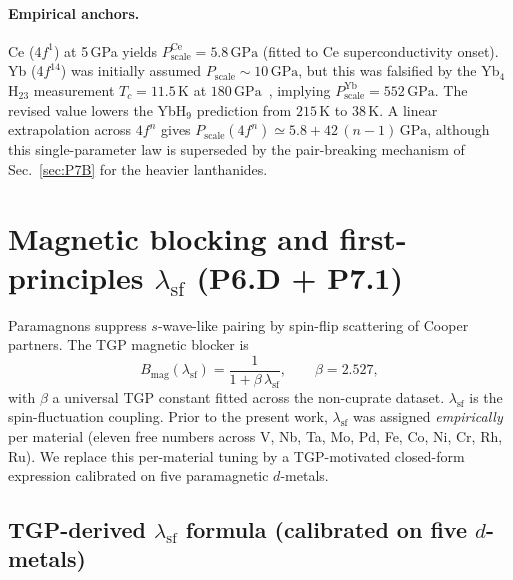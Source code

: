 \documentclass[11pt,a4paper]{article}
\newcommand{\lamsf}{\lambda_{\mathrm{sf}}}
\newcommand{\GPa}{\,\mathrm{GPa}}
\newcommand{\Bmag}{B_{\mathrm{mag}}}
\begin{document}
\paragraph{Empirical anchors.}
Ce (4$f^{1}$) at 5\,GPa yields $P_{\mathrm{scale}}^{\mathrm{Ce}}
=5.8\GPa$ (fitted to Ce superconductivity onset).
Yb (4$f^{14}$) was initially assumed $P_{\mathrm{scale}}\sim 10\GPa$, but
this was falsified by the Yb$_{4}$H$_{23}$ measurement $T_{c}=11.5$\,K at
$180\GPa$~\cite{Sharps2025}, implying $P_{\mathrm{scale}}^{\mathrm{Yb}}
=552\GPa$. The revised value lowers the YbH$_{9}$ prediction from
$215$\,K to $38$\,K. A linear extrapolation across $4f^{n}$ gives
$P_{\mathrm{scale}}(4f^{n})\simeq 5.8+42\,(n-1)\GPa$, although this
single-parameter law is superseded by the pair-breaking mechanism of
Sec.~\ref{sec:P7B} for the heavier lanthanides.

\section{Magnetic blocking and first-principles \texorpdfstring{$\lamsf$}{lambda-sf} (P6.D + P7.1)}
\label{sec:P6D-P7A}

Paramagnons suppress $s$-wave-like pairing by spin-flip scattering of
Cooper partners. The TGP magnetic blocker is
\begin{equation}\label{eq:Bmag}
  \Bmag(\lamsf) = \frac{1}{1+\beta\,\lamsf},
  \qquad \beta = 2.527,
\end{equation}
with $\beta$ a universal TGP constant fitted across the non-cuprate
dataset. $\lamsf$ is the spin-fluctuation coupling. Prior to the present
work, $\lamsf$ was assigned \emph{empirically} per material (eleven free
numbers across V, Nb, Ta, Mo, Pd, Fe, Co, Ni, Cr, Rh, Ru). We replace
this per-material tuning by a TGP-motivated closed-form expression
calibrated on five paramagnetic $d$-metals.

\subsection{TGP-derived \texorpdfstring{$\lamsf$}{lambda-sf} formula
(calibrated on five $d$-metals)}
\end{document}
